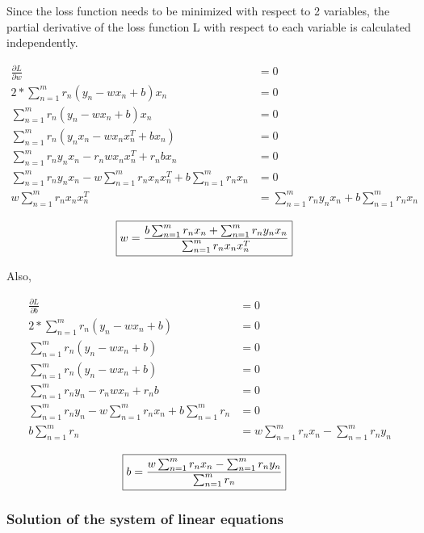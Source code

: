 \documentclass[a4paper]{article}
\begin{document}
Since the loss function needs to be minimized with respect to 2 variables, the partial derivative of the loss function L with respect to each variable is calculated independently.

\begin{align*}
	\frac{\partial L}{\partial w} &= 0\\
	2 * \sum_{n=1}^m r_n (y_n - wx_n + b) x_n &= 0\\
	\sum_{n=1}^m r_n (y_n - wx_n + b) x_n &= 0\\
	\sum_{n=1}^m r_n (y_n x_n - wx_nx_n^T + bx_n) &= 0\\
	\sum_{n=1}^m r_n y_n x_n - r_n w x_n x_n^T + r_n b x_n &= 0\\
	\sum_{n=1}^m r_n y_n x_n - w \sum_{n=1}^m r_n x_n x_n^T + b \sum_{n=1}^m r_n x_n &= 0\\
	w \sum_{n=1}^m r_n x_n x_n^T &=  \sum_{n=1}^m r_n y_n x_n + b \sum_{n=1}^m r_n x_n
\end{align*}

\begin{align}
\label{pd_w}
	\Aboxed{w  = \frac{b \sum_{n=1}^m r_n x_n + \sum_{n=1}^m r_n y_n x_n} {\sum_{n=1}^m r_n x_n x_n^T}}
\end{align}

\vspace{5mm}

Also, 

\begin{align*}
	\frac{\partial L}{\partial b} &= 0\\
	2 * \sum_{n=1}^m r_n (y_n - w x_n + b) &= 0\\
	\sum_{n=1}^m r_n (y_n - w x_n + b) &= 0\\
	\sum_{n=1}^m r_n (y_n - w x_n + b) &= 0\\
	\sum_{n=1}^m r_n y_n - r_n w x_n + r_n b &= 0\\
	\sum_{n=1}^m r_n y_n - w \sum_{n=1}^m r_n x_n + b \sum_{n=1}^m r_n &= 0\\
	b \sum_{n=1}^m r_n &= w \sum_{n=1}^m r_n x_n - \sum_{n=1}^m r_n y_n
\end{align*}

\begin{align}
\label{pd_b}
	\Aboxed{b = \frac{w \sum_{n=1}^m r_n x_n - \sum_{n=1}^m  r_n y_n}{\sum_{n=1}^m  r_n}}
\end{align}


\subsubsection{Solution of the system of linear equations}
\end{document}
